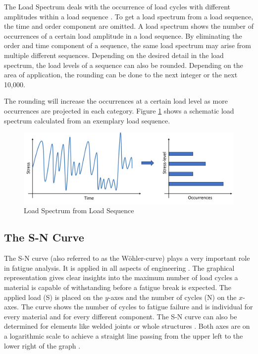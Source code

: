 The Load Spectrum deals with the occurrence of load cycles with different amplitudes within a load sequence \cite{Facchinetti}. To get a load spectrum from a load sequence, the time and order component are omitted. A load spectrum shows the number of occurrences of a certain load amplitude in a load sequence.
By eliminating the order and time component of a sequence, the same load spectrum may arise from multiple different sequences. Depending on the desired detail in the load spectrum, the load levels of a sequence can also be rounded. Depending on the area of application, the rounding can be done to the next integer or the next 10,000.

The rounding will increase the occurrences at a certain load level as more occurrences are projected in each category. 
Figure \ref{fig:LS} shows a schematic load spectrum calculated from an exemplary load sequence.


\begin{figure}[H]
	\centering
	\includegraphics[width=0.95\linewidth]{IMGs/Spectrum.png}
	\caption{Load Spectrum from Load Sequence}
	\label{fig:LS}
\end{figure}

\subsection{The S-N Curve}\label{sn}
The S-N curve (also referred to as the Wöhler-curve) plays a very important role in fatigue analysis. It is applied in all aspects of engineering \cite{Burhan,Pungo}. 
The graphical representation gives clear insights into the maximum number of load cycles a material is capable of withstanding before a fatigue break is expected.
The applied load (S) is placed on the \(y\)-axes and the number of cycles (N) on the \(x\)-axes. The curve shows the number of cycles to fatigue failure and is individual for every material and for every different component.
The S-N curve can also be determined for elements like welded joints or whole structures \cite{Baptista, Dong}.
Both axes are on a logarithmic scale to achieve a straight line passing from the upper left to the lower right of the graph \cite{Little}.

